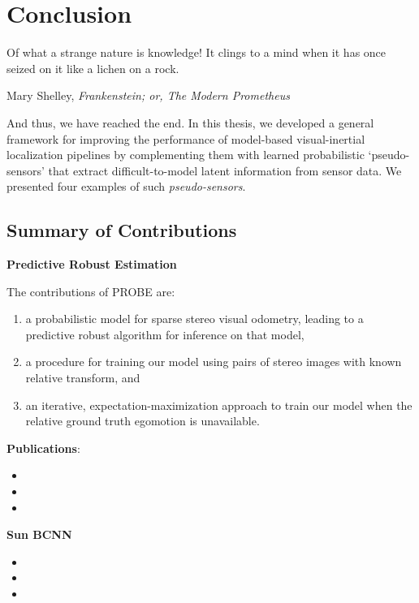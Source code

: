 \chapter{Conclusion}
\epigraph{Of what a strange nature is knowledge! It clings to a mind when it has once seized on it like a lichen on a rock.}{Mary Shelley, \textit{Frankenstein; or, The Modern Prometheus}}


And thus, we have reached the end. In this thesis, we developed a general framework for improving the performance of model-based visual-inertial localization pipelines by complementing them with learned probabilistic ‘pseudo-sensors’ that extract difficult-to-model latent information from sensor data.  We presented four examples of such \textit{pseudo-sensors}.

\section{Summary of Contributions}

\noindent\textbf{Predictive Robust Estimation}

The contributions of PROBE are:
\begin{enumerate}
\item a probabilistic model for sparse stereo visual odometry, leading to a predictive robust algorithm for inference on that model,
\item a procedure for training our model using pairs of stereo images with known relative transform, and
\item an iterative, expectation-maximization approach to train our model when the relative ground truth egomotion is unavailable.
\end{enumerate}

\textbf{Publications}:

\begin{itemize}
	\item {}
	\item {}
	\item {}
\end{itemize}

\noindent\textbf{Sun BCNN}

\begin{itemize}
	\item {}
	\item {}
	\item {}
\end{itemize}


